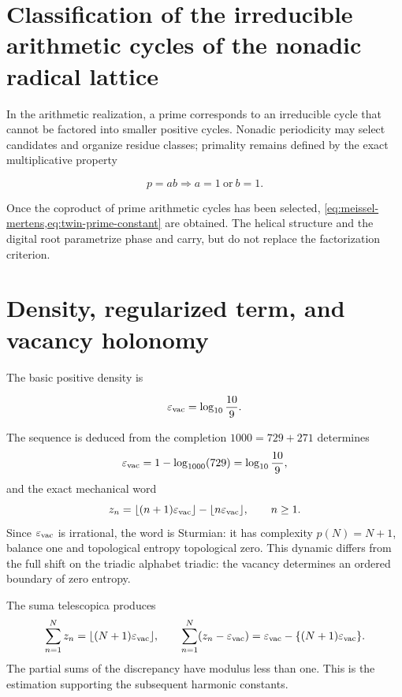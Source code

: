 \section{Classification of the irreducible arithmetic cycles of the nonadic radical lattice}

In the arithmetic realization, a prime corresponds
to an irreducible cycle that cannot be factored into smaller positive
cycles. Nonadic periodicity may select candidates and organize
residue classes; primality remains defined by the exact multiplicative
property

\[
p=ab\Longrightarrow a=1\ \text{or}\ b=1.
\]

Once the coproduct of prime arithmetic cycles has been selected,
\cref{eq:meissel-mertens,eq:twin-prime-constant} are obtained. The helical structure and the digital root
parametrize phase and carry, but do not replace the factorization criterion.

\section{Density, regularized term, and vacancy holonomy}

The basic positive density is

\begin{equation}
\varepsilon_{\rm vac}=\log_{10}\frac{10}{9}.
\label{eq:vacancy-density}
\end{equation}

The sequence is deduced from the completion
\(1000=729+271\) determines
\begin{equation}
\varepsilon_{\rm vac}
=1-\log_{1000}(729)
=\log_{10}\frac{10}{9},
\label{eq:vacancy-density-two-forms}
\end{equation}
and the exact mechanical word
\begin{equation}
z_n=\lfloor(n+1)\varepsilon_{\rm vac}\rfloor
-\lfloor n\varepsilon_{\rm vac}\rfloor,
\qquad n\ge1.
\label{eq:vacancy-mechanical-word}
\end{equation}
Since \(\varepsilon_{\rm vac}\) is irrational, the word is Sturmian:
it has complexity \(p(N)=N+1\), balance one and topological entropy topological zero.
This dynamic differs from the full shift on the triadic
alphabet triadic: the vacancy determines an ordered boundary of zero entropy.

The suma telescopica produces
\begin{equation}
\sum_{n=1}^{N}z_n
=\lfloor(N+1)\varepsilon_{\rm vac}\rfloor,
\qquad
\sum_{n=1}^{N}(z_n-\varepsilon_{\rm vac})
=\varepsilon_{\rm vac}
-\{(N+1)\varepsilon_{\rm vac}\}.
\label{eq:vacancy-discrepancy}
\end{equation}
The partial sums of the discrepancy have modulus less than one. This
is the estimation supporting the subsequent harmonic constants.

